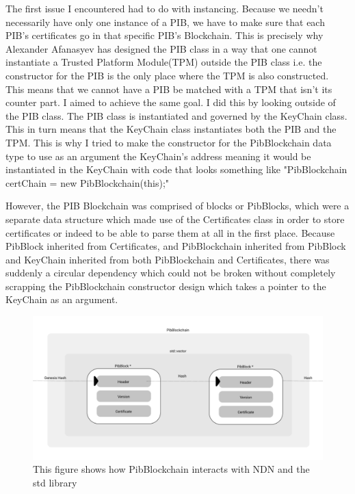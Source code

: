The first issue I encountered had to do with instancing. Because we needn't necessarily have only one instance of a PIB, we have to make sure that each PIB's certificates go in that specific PIB's Blockchain. This is precisely why Alexander Afanasyev has designed the PIB class in a way that one cannot instantiate a Trusted Platform Module(TPM) outside the PIB class i.e. the constructor for the PIB is the only place where the TPM is also constructed. This means that we cannot have a PIB be matched with a TPM that isn't its counter part. I aimed to achieve the same goal. I did this by looking outside of the PIB class. The PIB class is instantiated and governed by the KeyChain class. This in turn means that the KeyChain class instantiates both the PIB and the TPM. This is why I tried to make the constructor for the PibBlockchain data type to use as an argument the KeyChain's address meaning it would be instantiated in the KeyChain with code that looks something like "PibBlockchain certChain = new PibBlockchain(this);"

However, the PIB Blockchain was comprised of blocks or PibBlocks, which were a separate data structure which made use of the Certificates class in order to store certificates or indeed to be able to parse them at all in the first place. Because PibBlock inherited from Certificates, and PibBlockchain inherited from PibBlock and KeyChain inherited from both PibBlockchain and Certificates, there was suddenly a circular dependency which could not be broken without completely scrapping the PibBlockchain constructor design which takes a pointer to the KeyChain as an argument. 

\begin{figure}
\includegraphics[width=6in]{pibblockchain.png}
\caption{This figure shows how PibBlockchain interacts with NDN and the std library}
\end{figure}


